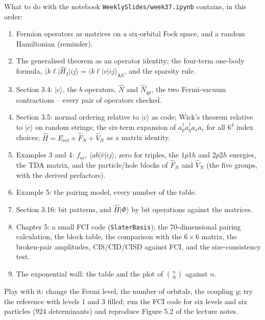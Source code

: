 \documentclass[aspectratio=169,10pt]{beamer}
\newcommand{\ket}[1]{\vert #1\rangle}
\newcommand{\element}[3]{\langle #1\vert #2\vert #3\rangle}
\begin{document}
\begin{frame}{What to do with the notebook}
  \footnotesize
  \texttt{WeeklySlides/week37.ipynb} contains, in this order:
  \begin{enumerate}
    \item Fermion operators as matrices on a six-orbital Fock space, and a random Hamiltonian (reminder).
    \item The generalised theorem as an operator identity; the four-term one-body formula, $\element{k\ell}{\hat{H}_I}{ij}=\element{k\ell}{v}{ij}_{\mathrm{AS}}$, and the sparsity rule.
    \item Section 3.4: $\ket{c}$, the $b$ operators, $\hat{N}$ and $\hat{N}_{qp}$, the two Fermi-vacuum contractions -- every pair of operators checked.
    \item Section 3.5: normal ordering relative to $\ket{c}$ as code; Wick's theorem relative to $\ket{c}$ on random strings; the six-term expansion of $a_p^{\dagger}a_q^{\dagger}a_sa_r$ for all $6^4$ index choices; $\hat{H}=E_{\mathrm{ref}}+\hat{F}_N+\hat{V}_N$ as a matrix identity.
    \item Examples 3 and 4: $f_{ai}$, $\element{ab}{\hat{v}}{ij}$, zero for triples, the $1p1h$ and $2p2h$ energies, the TDA matrix, and the particle/hole blocks of $\hat{F}_N$ and $\hat{V}_N$ (the five groups, with the derived prefactors).
    \item Example 5: the pairing model, every number of the table.
    \item Section 3.16: bit patterns, and $\hat{H}\ket{\Phi}$ by bit operations against the matrices.
    \item Chapter 5: a small FCI code (\texttt{SlaterBasis}); the $70$-dimensional pairing calculation, the block table, the comparison with the $6\times6$ matrix, the broken-pair amplitudes, CIS/CID/CISD against FCI, and the size-consistency test.
    \item The exponential wall: the table and the plot of $\binom{n}{N}$ against $n$.
  \end{enumerate}
  Play with it: change the Fermi level, the number of orbitals, the coupling $g$; try the reference with levels $1$ and $3$ filled; run the FCI code for six levels and six particles ($924$ determinants) and reproduce Figure 5.2 of the lecture notes.
\end{frame}
\end{document}
